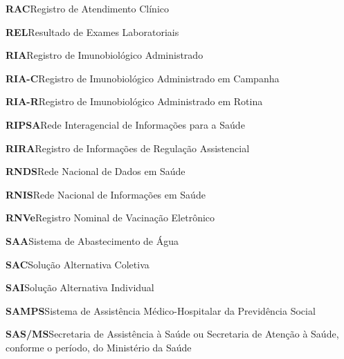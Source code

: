 \noindent\textbf{RAC}\hspace{1em}Registro de Atendimento Clínico\par\smallskip
\noindent\textbf{REL}\hspace{1em}Resultado de Exames Laboratoriais\par\smallskip
\noindent\textbf{RIA}\hspace{1em}Registro de Imunobiológico Administrado\par\smallskip
\noindent\textbf{RIA-C}\hspace{1em}Registro de Imunobiológico Administrado em Campanha\par\smallskip
\noindent\textbf{RIA-R}\hspace{1em}Registro de Imunobiológico Administrado em Rotina\par\smallskip
\noindent\textbf{RIPSA}\hspace{1em}Rede Interagencial de Informações para a Saúde\par\smallskip
\noindent\textbf{RIRA}\hspace{1em}Registro de Informações de Regulação Assistencial\par\smallskip
\noindent\textbf{RNDS}\hspace{1em}Rede Nacional de Dados em Saúde\par\smallskip
\noindent\textbf{RNIS}\hspace{1em}Rede Nacional de Informações em Saúde\par\smallskip
\noindent\textbf{RNVe}\hspace{1em}Registro Nominal de Vacinação Eletrônico\par\smallskip
\noindent\textbf{SAA}\hspace{1em}Sistema de Abastecimento de Água\par\smallskip
\noindent\textbf{SAC}\hspace{1em}Solução Alternativa Coletiva\par\smallskip
\noindent\textbf{SAI}\hspace{1em}Solução Alternativa Individual\par\smallskip
\noindent\textbf{SAMPS}\hspace{1em}Sistema de Assistência Médico-Hospitalar da Previdência Social\par\smallskip
\noindent\textbf{SAS/MS}\hspace{1em}Secretaria de Assistência à Saúde ou Secretaria de Atenção à Saúde, conforme o período, do Ministério da Saúde\par\smallskip

